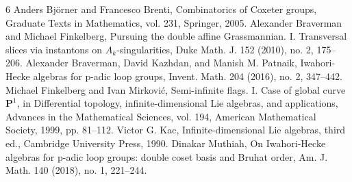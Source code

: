 \begin{thebibliography}{6}
 Anders Björner and Francesco Brenti, Combinatorics of Coxeter groups, Graduate Texts in Mathematics, vol. 231, Springer, 2005.
 Alexander Braverman and Michael Finkelberg, Pursuing the double affine Grassmannian. I. Transversal slices via instantons on $A_k$-singularities, Duke Math. J. 152 (2010), no. 2, 175--206.
 Alexander Braverman, David Kazhdan, and Manish M. Patnaik, Iwahori-Hecke algebras for p-adic loop groups, Invent. Math. 204 (2016), no. 2, 347--442.
 Michael Finkelberg and Ivan Mirković, Semi-infinite flags. I. Case of global curve $\mathbf{P}^1$, in Differential topology, infinite-dimensional Lie algebras, and applications, Advances in the Mathematical Sciences, vol. 194, American Mathematical Society, 1999, pp. 81--112.
 Victor G. Kac, Infinite-dimensional Lie algebras, third ed., Cambridge University Press, 1990.
 Dinakar Muthiah, On Iwahori-Hecke algebras for p-adic loop groups: double coset basis and Bruhat order, Am. J. Math. 140 (2018), no. 1, 221--244.
\end{thebibliography}
